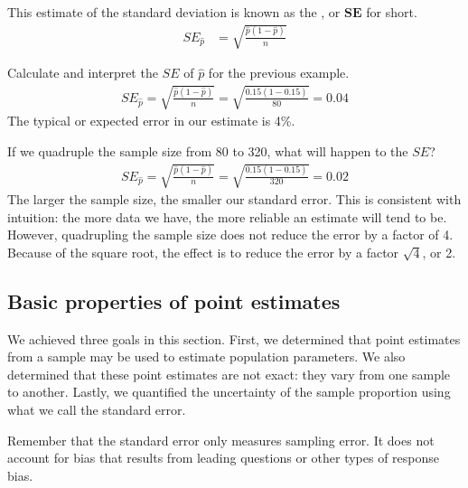 This estimate of the standard deviation is known as the , or $\pmb{SE}$ for short.
\begin{align*}
SE_{\hat{p}}&=\sqrt{\frac{\hat{p}(1-\hat{p})}{n}}
\end{align*}

\begin{examplewrap}
\begin{nexample}{Calculate and interpret the $SE$ of $\hat{p}$ for the previous example.}
\begin{align*}
SE_{\hat{p}}=\sqrt{\frac{\hat{p}(1-\hat{p})}{n}} =\sqrt{\frac{0.15(1-0.15)}{80}}=0.04
\end{align*}
The typical or expected error in our estimate is 4\%.
\end{nexample}
\end{examplewrap}

\begin{examplewrap}
\begin{nexample}{If we quadruple the sample size from 80 to 320, what will happen to the $SE$?}
\begin{align*}
SE_{\hat{p}}=\sqrt{\frac{\hat{p}(1-\hat{p})}{n}} =\sqrt{\frac{0.15(1-0.15)}{320}}=0.02
\end{align*}
The larger the sample size, the smaller our standard error. This is consistent with intuition: the more data we have, the more reliable an estimate will tend to be. However, quadrupling the sample size does not reduce the error by a factor of 4. Because of the square root, the effect is to reduce the error by a factor $\sqrt{4}$, or 2. 
\end{nexample}
\end{examplewrap}


\D{\newpage}

\subsection{Basic properties of point estimates}

We achieved three goals in this section. First, we determined that point estimates from a sample may be used to estimate population parameters. We also determined that these point estimates are not exact: they vary from one sample to another. Lastly, we quantified the uncertainty of the sample proportion using what we  call the standard error. 

Remember that the standard error only measures sampling error.  It does not account for bias that results from leading questions or other types of response bias.

